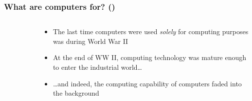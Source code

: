 \documentclass[\printmode,compress,xcolor=dvipsnames]{beamer}
\begin{document}
\begin{frame}
  \frametitle<+->{What are computers for? ()}

  \begin{columns}[T]
    \begin{column}{\leftcolumn}
      \begin{figure}[H!]
      \end{figure}
    \end{column}
    \begin{column}{\rightcolumn}
      \begin{itemize}[<+- | alert@+->]

          \item The last time computers were used \emph{solely} for computing purposes
                  was during World War II

          \item At the end of WW II, computing technology was mature enough to
                enter the industrial world\dots

          \item \dots and indeed, the computing capability of computers faded into the
                  background

      \end{itemize}
    \end{column}
  \end{columns}
\end{frame}

\end{document}
